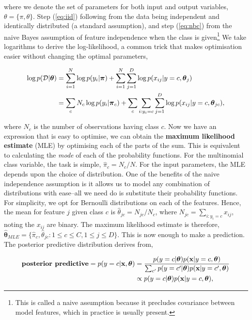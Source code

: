 \documentclass[11pt]{amsart}
\begin{document}
where we denote the set of parameters for both input and output variables, $\theta = \{\pi, \theta\}$. Step (\ref{eq:iid}) following from the data being independent and identically distributed (a standard assumption), and step (\ref{eq:nbc}) from the naive Bayes assumption of feature independence when the class is given\footnote{This is called a naive assumption because it precludes covariance between model features, which in practice is usually present.} We take logarithms to derive the log-likelihood, a common trick that makes optimisation easier without changing the optimal parameters,

\begin{align}
\log p(\mathcal{D}|\boldsymbol\theta) &= \sum_{i=1}^N \log p(y_i|\boldsymbol\pi) + \sum_{i=1}^N\sum_{j = 1}^D\log p(x_{ij}|y=c,\boldsymbol\theta_j) \notag \\
&= \sum_{c} N_c\log p(y_i|\boldsymbol\pi_c) + \sum_{c}\sum_{i:y_i=c}\sum_{j = 1}^D\log p(x_{ij}|y=c,\boldsymbol\theta_{jc}), \notag
\end{align}

where $N_c$ is the number of observations having class $c$. Now we have an expression that is easy to optimise, we can obtain the \textbf{maximum likelihood estimate} (MLE) by optimising each of the parts of the sum. This is equivalent to calculating the \emph{mode} of each of the probability functions. For the multinomial class variable, the task is simple, $\hat\pi_c = N_c/N.$ For the input parameters, the MLE depends upon the choice of distribution. One of the benefits of the naive independence assumption is it allows us to model any combination of distributions with ease--all we need do is substitute their probability functions. For simplicity, we opt for Bernoulli distributions on each of the features. Hence, the mean for feature $j$ given class $c$ is $\hat\theta_{jc} = N_{jc}/N_c$, where $N_{jc} = \sum_{i:y_i=c} x_{ij}$, noting the $x_{ij}$ are binary. The maximum likelihood estimate is therefore, $\hat{\boldsymbol\theta}_{MLE} = \{\hat\pi_c, \hat\theta_{jc} : 1\leq c\leq C, 1\leq j\leq D\}$. This is now enough to make a prediction. The posterior predictive distribution derives from,

\begin{align}
\textbf{posterior predictive} = p(y = c|\mathbf{x},\boldsymbol\theta) 
&= \frac{p(y = c|\boldsymbol\theta)p(\mathbf{x}|y=c,\boldsymbol\theta)}{\sum_{c'}p(y = c'|\boldsymbol\theta)p(\mathbf{x}|y=c',\boldsymbol\theta)} \notag \\
&\propto p(y = c|\boldsymbol\theta)p(\mathbf{x}|y=c,\boldsymbol\theta), \notag
\end{align}
\end{document}
